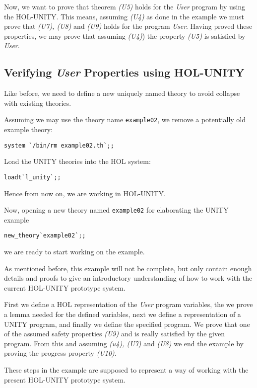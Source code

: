 Now, we want to prove that theorem {\it (U5)} holds for the {\it User} program
by using the HOL-UNITY.  This means, assuming {\it (U4)} as done in the example
\cite{CM88} we must prove that {\it (U7), (U8)} and {\it (U9)} holds for the
program {\it User}.  Having proved these properties, we may prove that assuming
{\it (U4)}) the property {\it (U5)} is satisfied by {\it User}.


\subsection{Verifying {\it User} Properties using HOL-UNITY}

Like before, we need to define a new uniquely named theory to avoid collapse
with existing theories.

Assuming we may use the theory name {\tt example02}, we remove a potentially 
old example theory:
{\footnotesize 
\begin{verbatim}
system `/bin/rm example02.th`;;
\end{verbatim}
}

Load the UNITY theories into the HOL system:
{\footnotesize 
\begin{verbatim}
loadt`l_unity`;;
\end{verbatim}
}Hence from now on, we are working in HOL-UNITY.

Now, opening a new theory named {\tt example02} for elaborating the UNITY
example
{\footnotesize 
\begin{verbatim}
new_theory`example02`;;
\end{verbatim}
}
we are ready to start working on the example.

As mentioned before, this example will not be complete, but only contain enough
details and proofs to give an introductory understanding of how to work with
the current HOL-UNITY prototype system.

First we define a HOL representation of the {\it User} program variables, the
we prove a lemma needed for the defined variables, next we define a
representation of a UNITY program, and finally we define the specified program.
We prove that one of the assumed safety properties {\it (U9)} and is really 
satisfied by the given program.  From this and assuming {\it (u4), (U7)} and
{\it (U8)} we end the example by proving the progress property {\it (U10)}.

These steps in the example are supposed to represent a way of working with the
present HOL-UNITY prototype system.


